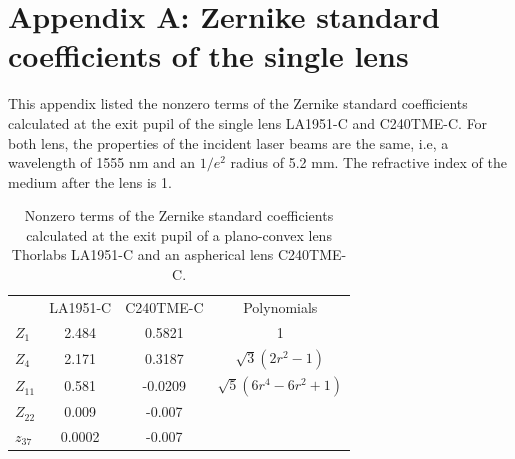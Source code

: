 \documentclass[9pt,twocolumn,twoside]{osajnl}
\begin{document}
\appendix
\section*{Appendix A: Zernike standard coefficients of the single lens}
\setcounter{table}{0}
\renewcommand{\thetable}{A\arabic{table}}
This appendix listed the nonzero terms of the Zernike standard coefficients calculated at the exit pupil of the single lens LA1951-C and C240TME-C. For both lens, the properties of the incident laser beams are the same, i.e, a wavelength of 1555 nm and an $1/e^2$ radius of 5.2 mm. The refractive index of the medium after the lens is 1.
\begin{table}[h!]
	\centering
	\begin{tabular}[c]{|l|c|c|c|}
		\hline
		\rowcolor{lightgray}
		\rowcolor{gray}
		 & LA1951-C & C240TME-C & Polynomials\\
		$Z_1$ & 2.484 & 0.5821 & 1 \\
		\rowcolor{lightgray}
		$Z_4$ & 2.171 & 0.3187 & $\sqrt{3}(2r^2-1)$ \\
		$Z_{11}$ & 0.581 & -0.0209 & $\sqrt{5}(6r^4-6r^2+1)$ \\
		\rowcolor{lightgray}
		$Z_{22}$ & 0.009 & -0.007 & \vtop{\hbox{\strut $\sqrt{7}(20r^6-30r^4$}\hbox{\strut $+12r^2-1)$}}\\
		$z_{37}$ & 0.0002 & -0.007 & \vtop{\hbox{\strut $\sqrt{9}(70r^8-140r^6$}\hbox{\strut $+90r^4-20r^2+1)$}}\\
		\hline
	\end{tabular}	
	\caption{Nonzero terms of the Zernike standard coefficients calculated at the exit pupil of a plano-convex lens Thorlabs LA1951-C and an aspherical lens C240TME-C.}\label{tab:A1}
\end{table}



\end{document}
